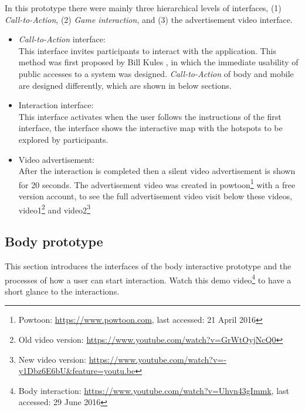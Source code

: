 In this prototype there were mainly three hierarchical levels of interfaces, (1) \emph{Call-to-Action}, (2) \emph{Game interaction}, and (3) the advertisement video interface.

\begin{itemize}
\item \emph{Call-to-Action} interface: \\
This interface invites participants to interact with the application. This method was first proposed by Bill Kules \cite{call-to-action}, in which the immediate usability of public accesses to a system was designed. \emph{Call-to-Action} of body and mobile are designed differently, which are shown in below sections. 

\item Interaction interface: \\
This interface activates when the user follows the instructions of the first interface, the interface shows the interactive map with the hotspots to be explored by participants.

\item Video advertisement: \\
After the interaction is completed then a silent video advertisement is shown for 20 seconds. 
The advertisement video was created in powtoon\footnote{Powtoon: \url{https://www.powtoon.com}, last accessed: 21 April 2016} with a free version account, to see the full advertisement video visit below these videos, video1\footnote{Old video version: \url{https://www.youtube.com/watch?v=GrWtOyjNcQ0}} and video2\footnote{ New video version: \url{https://www.youtube.com/watch?v=-y1Dbz6E6bU&feature=youtu.be}}

\end{itemize}


\newpage
\subsection{Body prototype}
This section introduces the interfaces of the body interactive prototype and the processes of how a user can start interaction. Watch this demo video\footnote{Body interaction: \url{https://www.youtube.com/watch?v=Uhvn43gImmk}, last accessed: 29 June 2016} to have a short glance to the interactions.

